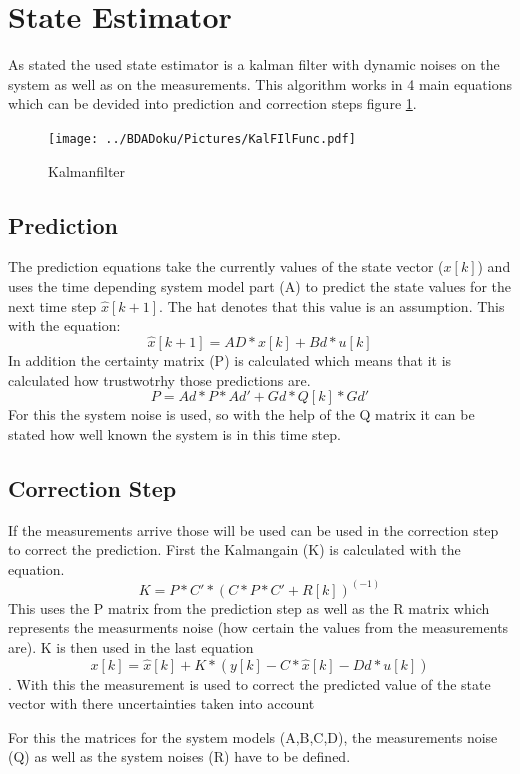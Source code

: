 \section{State Estimator} %
As stated the used state estimator is a kalman filter with dynamic noises on the system as well as on the measurements.
This algorithm works in 4 main equations which can be devided into prediction and correction steps figure \ref{fig:Kalmanfilter}.

\begin{figure}[h!]
  \centering
  \texttt{[image: ../BDADoku/Pictures/KalFIlFunc.pdf]}
  \caption{Kalmanfilter}
  \label{fig:Kalmanfilter}
\end{figure}

\subsection{Prediction}
The prediction equations take the currently values of the state vector ($x[k]$)
and uses the time depending system model part (A) to predict the state values for the next time step $\hat{x}[k+1]$.
The hat denotes that this value is an assumption.
This with the equation: $$ \hat{x}[k+1] = AD*x[k] + Bd*u[k] $$
In addition the certainty matrix (P) is calculated which means that it is calculated how trustwotrhy those predictions are.
$$ P = Ad*P*Ad' + Gd*Q[k]*Gd'$$
For this the system noise is used, so with the help of the Q matrix it can be stated how well known the system is in this
time step.

\subsection{Correction Step}
If the measurements arrive those will be used can be used in the correction step to correct the prediction.
First the Kalmangain (K) is calculated with the equation.
$$ K = P*C'*(C*P*C' + R[k])^(-1) $$ 
This uses the P matrix from the prediction step as well as the R matrix which represents the measurments noise (how certain the values from the measurements are).
K is then used in the last equation $$x[k] = \hat{x}[k] + K*(y[k] - C*\hat{x}[k]-Dd*u[k])$$.
With this the measurement is used to correct the predicted value of the state vector with there uncertainties taken into account 

For this the matrices for the system models (A,B,C,D), the measurements noise (Q) as well as the system noises (R) have to be defined.

